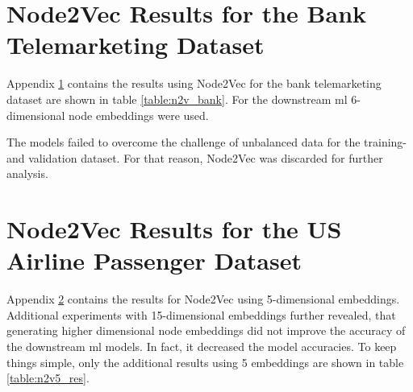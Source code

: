 
  \section[Bank]{Node2Vec Results for the Bank Telemarketing Dataset}
  \label{app:n2v_bank}

  Appendix \ref{app:n2v_bank} contains the results using Node2Vec for the 
  bank telemarketing dataset are shown in table \ref{table:n2v_bank}. For the 
  downstream \acs{ml} 6-dimensional node embeddings were used.

  \begin{table}
    \centering
    \caption{Node2Vec Classification Results Bank Telemarketing Dataset}
    \label{table:n2v_bank}
  \end{table}

  \noindent The models failed to overcome the challenge of unbalanced data for
  the training- and validation dataset. For that reason, Node2Vec was discarded
  for further analysis. 

  \section[Airline]{Node2Vec Results for the US Airline Passenger Dataset}
  \label{app:n2v5}

  Appendix \ref{app:n2v5} contains the results for Node2Vec using 5-dimensional 
  embeddings. Additional experiments with 15-dimensional embeddings further 
  revealed, that generating higher dimensional node embeddings did not improve 
  the accuracy of the downstream \acs{ml} models. In fact, it decreased the 
  model accuracies. To keep things simple, only the additional results using 
  5 embeddings are shown in table \ref{table:n2v5_res}.

